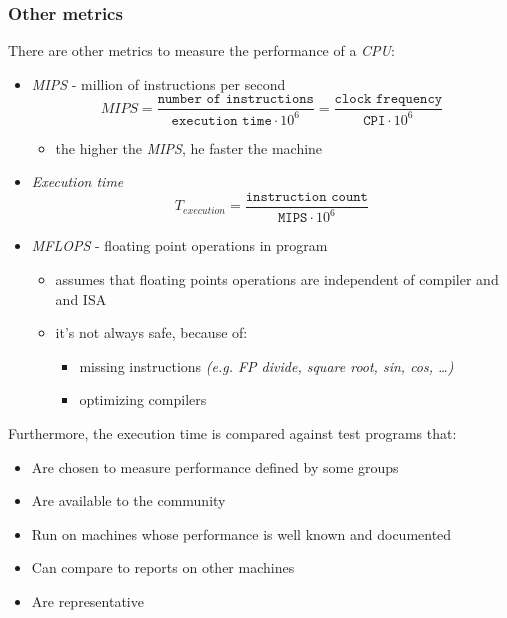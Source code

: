 \documentclass[english]{article}
\begin{document}
\subsubsection{Other metrics}

There are other metrics to measure the performance of a \textit{CPU}:

\begin{itemize}
  \item \textit{MIPS} - million of instructions per second
        \[ MIPS = \dfrac{\texttt{number of instructions}}{\texttt{execution time} \cdot 10^6} = \dfrac{\texttt{clock frequency}}{\texttt{CPI} \cdot 10^6} \]
        \begin{itemize}
          \item the higher the \textit{MIPS}, he faster the machine
        \end{itemize}
  \item \textit{Execution time}
        \[ T_{execution} = \dfrac{\texttt{instruction count}}{\texttt{MIPS} \cdot 10^6} \]
  \item \textit{MFLOPS} - floating point operations in program
        \begin{itemize}
          \item assumes that floating points operations are independent of compiler and and ISA
          \item it's not always safe, because of:
                \begin{itemize}
                  \item missing instructions \textit{(e.g. FP divide, square root, sin, cos, \dots)}
                  \item optimizing compilers
                \end{itemize}
        \end{itemize}
\end{itemize}

Furthermore, the execution time is compared against test programs that:

\begin{itemize}
  \item Are chosen to measure performance defined by some groups
  \item Are available to the community
  \item Run on machines whose performance is well known and documented
  \item Can compare to reports on other machines
  \item Are representative
\end{itemize}
\end{document}
